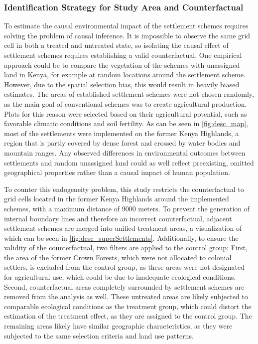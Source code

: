 \subsubsection{Identification Strategy for Study Area and Counterfactual}
To estimate the causal environmental impact of the settlement schemes requires solving the problem of causal inference.
It is impossible to observe the same grid cell in both a treated and untreated state, so isolating the causal effect of settlement schemes requires establishing a valid counterfactual.
One empirical approach could be to compare the vegetation of the schemes with unassigned land in Kenya, for example at random locations around the settlement scheme.
However, due to the spatial selection bias, this would result in heavily biased estimates.
The areas of established settlement schemes were not chosen randomly, as the main goal of conventional schemes was to create agricultural production.
Plots for this reason were selected based on their agricultural potential, such as favorable climatic conditions and soil fertility.
As can be seen in \cref{fig:desc_map}, most of the settlements were implemented on the former Kenya Highlands, a region that is partly covered by dense forest and crossed by water bodies and mountain ranges.
Any observed differences in environmental outcomes between settlements and random unassigned land could as well reflect preexisting, omitted geographical properties rather than a causal impact of human population.

To counter this endogeneity problem, this study restricts the counterfactual to grid cells located in the former Kenya Highlands around the implemented schemes, with a maximum distance of 9000 meters.
To prevent the generation of internal boundary lines and therefore an incorrect counterfactual, adjacent settlement schemes are merged into unified treatment areas, a visualization of which can be seen in \cref{fig:desc_superSettlements}.
Additionally, to ensure the validity of the counterfactual, two filters are applied to the control group:
First, the area of the former Crown Forests, which were not allocated to colonial settlers, is excluded from the control group, as these areas were not designated for agricultural use, which could be due to inadequate ecological conditions.
Second, counterfactual areas completely surrounded by settlement schemes are removed from the analysis as well. These untreated areas are likely subjected to comparable ecological conditions as the treatment group,
which could distort the estimation of the treatment effect, as they are assigned to the control group.
The remaining areas likely have similar geographic characteristics, as they were subjected to the same selection criteria and land use patterns.

